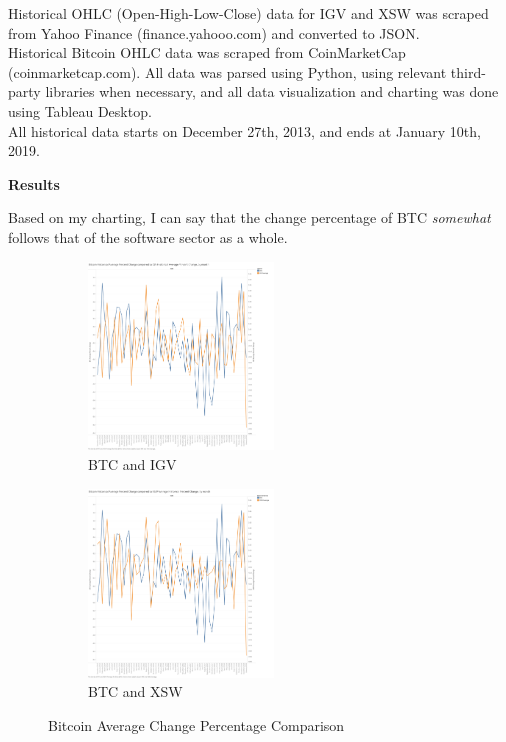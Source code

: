\documentclass[12pt]{article}
\begin{document}
Historical OHLC (Open-High-Low-Close) data for IGV and XSW was scraped from Yahoo Finance (finance.yahooo.com) and converted to JSON. 
\\
Historical Bitcoin OHLC data was scraped from CoinMarketCap (coinmarketcap.com). All data was parsed using Python, using relevant third-party libraries when necessary, and all data visualization and charting was done using Tableau Desktop. 
\\ All historical data starts on December 27th, 2013, and ends at January 10th, 2019.

\begin{center}
\LARGE \textbf{Results}
\end{center}

Based on my charting, I can say that the change percentage of BTC \textit{somewhat} follows that of the software sector as a whole. 

\begin{figure}[h]
\begin{subfigure}{0.5\textwidth}	
\includegraphics[width=0.9\linewidth, height=5cm]{images/BTC-IGV_avg_percent_change_chart.png}
\caption{BTC and IGV}
\end{subfigure}
\begin{subfigure}{0.5\textwidth}
\includegraphics[width=0.9\linewidth, height=5cm]{images/BTC-XSW_avg_percent_change_chart.png}
\caption{BTC and XSW}
\end{subfigure}

\caption{Bitcoin Average Change Percentage Comparison}
\end{figure}
\end{document}
